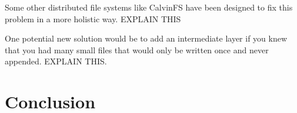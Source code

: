 \documentclass[11pt, a4paper]{article}
\begin{document}
\begin{multicols*}{2}
Some other distributed file systems like CalvinFS have been designed to fix this problem in a more holistic way. EXPLAIN THIS 

One potential new solution would be to add an intermediate layer if you knew that you had many small files that would only be written once and never appended. 
EXPLAIN THIS.

\section{Conclusion}



\end{multicols*}
\end{document}
